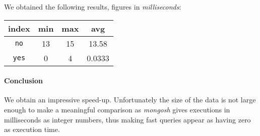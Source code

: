 


We obtained the following results, figures in \textit{milliseconds}:


\begin{tabular}{|c|c|c|c|}
	\hline
	index & min & max & avg \\
	\hline
	\hline
	\texttt{no} & 13 & 15 & 13.58 \\
	\hline
	\texttt{yes} & 0 & 4 & 0.0333 \\
	\hline
\end{tabular}

\paragraph{Conclusion}
We obtain an impressive speed-up. Unfortunately the size of the data is not 
large enough to make a meaningful comparison as \textit{mongosh} gives 
executions in milliseconds as integer numbers, thus making fast queries appear 
as having zero as execution time.
